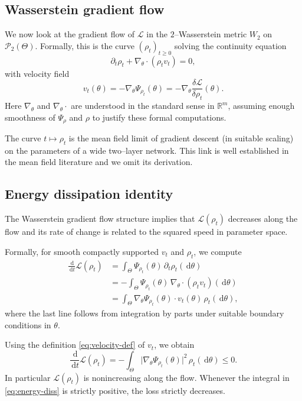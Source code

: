 \documentclass[11pt]{article}
\numberwithin{equation}{section}
\theoremstyle{definition}
\newcommand{\R}{\mathbb{R}}
\newcommand{\Ptwo}{\mathcal{P}_2}
\newcommand{\dd}{\,\mathrm{d}}
\newcommand{\1}{\mathbbm{1}}
\begin{document}
\subsection{Wasserstein gradient flow}

We now look at the gradient flow of $\mathcal{L}$ in the $2$--Wasserstein metric $W_2$ on $\Ptwo(\Theta)$. Formally, this is the curve $(\rho_t)_{t\ge 0}$ solving the continuity equation
\begin{equation}
\label{eq:WGF-continuity}
\partial_t \rho_t + \nabla_\theta\cdot(\rho_t v_t) = 0,
\end{equation}
with velocity field
\begin{equation}
\label{eq:velocity-def}
v_t(\theta) = -\nabla_\theta \Psi_{\rho_t}(\theta)
= -\nabla_\theta \frac{\delta \mathcal{L}}{\delta\rho_t}(\theta).
\end{equation}
Here $\nabla_\theta$ and $\nabla_\theta\cdot$ are understood in the standard sense in $\R^m$, assuming enough smoothness of $\Psi_\rho$ and $\rho$ to justify these formal computations.

The curve $t\mapsto \rho_t$ is the mean field limit of gradient descent (in suitable scaling) on the parameters of a wide two--layer network. This link is well established in the mean field literature and we omit its derivation.

\subsection{Energy dissipation identity}

The Wasserstein gradient flow structure implies that $\mathcal{L}(\rho_t)$ decreases along the flow and its rate of change is related to the squared speed in parameter space.

Formally, for smooth compactly supported $v_t$ and $\rho_t$, we compute
\begin{align}
\frac{\dd}{\dd t}\mathcal{L}(\rho_t)
&= \int_\Theta \Psi_{\rho_t}(\theta)\,\partial_t\rho_t(\dd\theta) \\
&= -\int_\Theta \Psi_{\rho_t}(\theta)\,\nabla_\theta\cdot(\rho_t v_t)(\dd\theta) \\
&= \int_\Theta \nabla_\theta \Psi_{\rho_t}(\theta)\cdot v_t(\theta)\,\rho_t(\dd\theta),
\end{align}
where the last line follows from integration by parts under suitable boundary conditions in $\theta$.

Using the definition \eqref{eq:velocity-def} of $v_t$, we obtain
\begin{equation}
\label{eq:energy-diss}
\frac{\dd}{\dd t}\mathcal{L}(\rho_t)
= -\int_\Theta \bigl|\nabla_\theta \Psi_{\rho_t}(\theta)\bigr|^2\,\rho_t(\dd\theta)
\le 0.
\end{equation}
In particular $\mathcal{L}(\rho_t)$ is nonincreasing along the flow. Whenever the integral in \eqref{eq:energy-diss} is strictly positive, the loss strictly decreases.
\end{document}
